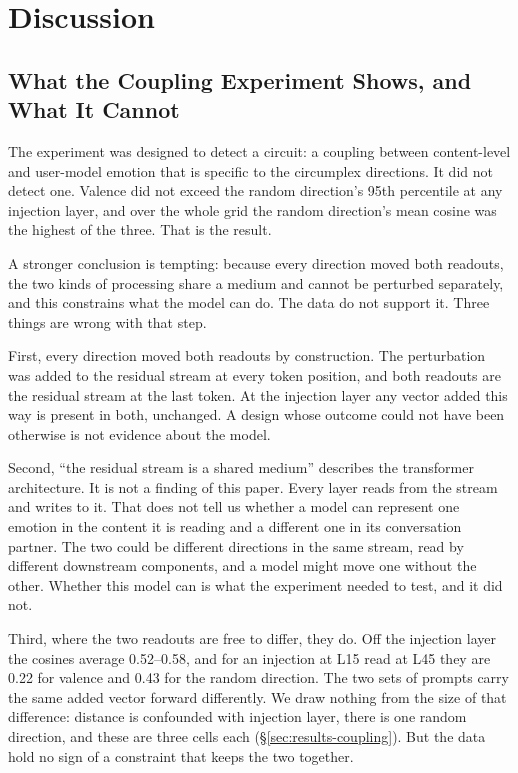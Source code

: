 \documentclass[11pt,a4paper]{article}
\begin{document}
\section{Discussion}
\label{sec:discussion}

\subsection{What the Coupling Experiment Shows, and What It Cannot}
\label{sec:disc-coupling}

The experiment was designed to detect a circuit: a coupling between content-level and user-model emotion that is specific to the circumplex directions. It did not detect one. Valence did not exceed the random direction's 95th percentile at any injection layer, and over the whole grid the random direction's mean cosine was the highest of the three. That is the result.

A stronger conclusion is tempting: because every direction moved both readouts, the two kinds of processing share a medium and cannot be perturbed separately, and this constrains what the model can do. The data do not support it. Three things are wrong with that step.

First, every direction moved both readouts by construction. The perturbation was added to the residual stream at every token position, and both readouts are the residual stream at the last token. At the injection layer any vector added this way is present in both, unchanged. A design whose outcome could not have been otherwise is not evidence about the model.

Second, ``the residual stream is a shared medium'' describes the transformer architecture. It is not a finding of this paper. Every layer reads from the stream and writes to it. That does not tell us whether a model can represent one emotion in the content it is reading and a different one in its conversation partner. The two could be different directions in the same stream, read by different downstream components, and a model might move one without the other. Whether this model can is what the experiment needed to test, and it did not.

Third, where the two readouts are free to differ, they do. Off the injection layer the cosines average 0.52--0.58, and for an injection at L15 read at L45 they are 0.22 for valence and 0.43 for the random direction. The two sets of prompts carry the same added vector forward differently. We draw nothing from the size of that difference: distance is confounded with injection layer, there is one random direction, and these are three cells each (\S\ref{sec:results-coupling}). But the data hold no sign of a constraint that keeps the two together.
\end{document}

